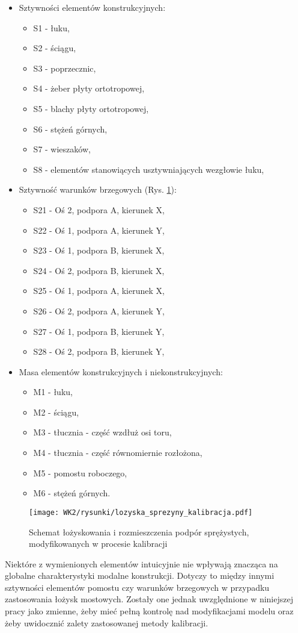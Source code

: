 \begin{itemize}
	\item Sztywności elementów konstrukcyjnych:
	\begin{itemize}
		\item S1 - łuku,
		\item S2 - ściągu,
		\item S3 - poprzecznic,
		\item S4 - żeber płyty ortotropowej,
		\item S5 - blachy płyty ortotropowej,
		\item S6 - stężeń górnych,
		\item S7 - wieszaków,
		\item S8 - elementów stanowiących usztywniających wezgłowie łuku,  
	\end{itemize}
	\item Sztywność warunków brzegowych (Rys. \ref{fig:boudary_conditions_stiff_bearings}):
	\begin{itemize}
		\item S21 - Oś 2, podpora A, kierunek X,
		\item S22 - Oś 1, podpora A, kierunek Y,
		\item S23 - Oś 1, podpora B, kierunek X,
		\item S24 - Oś 2, podpora B, kierunek X,
		\item S25 - Oś 1, podpora A, kierunek X,
		\item S26 - Oś 2, podpora A, kierunek Y,
		\item S27 - Oś 1, podpora B, kierunek Y,
		\item S28 - Oś 2, podpora B, kierunek Y,
	\end{itemize}
	\item Masa elementów konstrukcyjnych i niekonstrukcyjnych:
	\begin{itemize}
		\item M1 - łuku,
		\item M2 - ściągu,
		\item M3 - tłucznia - część wzdłuż osi toru,
		\item M4 - tłucznia - część równomiernie rozłożona,
		\item M5 - pomostu roboczego,
		\item M6 - stężeń górnych.
	\end{itemize}
\end{itemize}

\begin{figure}[h]
	\centering
	\texttt{[image: WK2/rysunki/lozyska\_sprezyny\_kalibracja.pdf]}
	\captionsetup{justification=centering}
	\caption{Schemat łożyskowania i rozmieszczenia podpór sprężystych, modyfikowanych w procesie kalibracji}
	\label{fig:boudary_conditions_stiff_bearings}
\end{figure}
Niektóre z wymienionych elementów intuicyjnie nie wpływają znacząca na globalne charakterystyki modalne konstrukcji. Dotyczy to między innymi sztywności elementów pomostu czy warunków brzegowych w przypadku zastosowania łożysk mostowych. Zostały one jednak uwzględnione w niniejszej pracy jako zmienne, żeby mieć pełną kontrolę nad modyfikacjami modelu oraz żeby uwidocznić zalety zastosowanej metody kalibracji.

